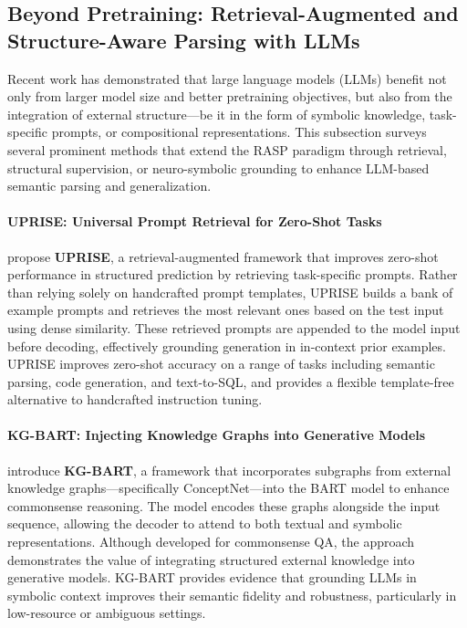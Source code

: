 \subsection{Beyond Pretraining: Retrieval-Augmented and Structure-Aware Parsing with LLMs}

Recent work has demonstrated that large language models (LLMs) benefit not only from larger model size and better pretraining objectives, but also from the integration of external structure—be it in the form of symbolic knowledge, task-specific prompts, or compositional representations. This subsection surveys several prominent methods that extend the RASP paradigm through retrieval, structural supervision, or neuro-symbolic grounding to enhance LLM-based semantic parsing and generalization.

\paragraph{UPRISE: Universal Prompt Retrieval for Zero-Shot Tasks}

\citet{cheng2023uprise} propose \textbf{UPRISE}, a retrieval-augmented framework that improves zero-shot performance in structured prediction by retrieving task-specific prompts. Rather than relying solely on handcrafted prompt templates, UPRISE builds a bank of example prompts and retrieves the most relevant ones based on the test input using dense similarity. These retrieved prompts are appended to the model input before decoding, effectively grounding generation in in-context prior examples. UPRISE improves zero-shot accuracy on a range of tasks including semantic parsing, code generation, and text-to-SQL, and provides a flexible template-free alternative to handcrafted instruction tuning.

\paragraph{KG-BART: Injecting Knowledge Graphs into Generative Models}

\citet{liu2021kgbart} introduce \textbf{KG-BART}, a framework that incorporates subgraphs from external knowledge graphs—specifically ConceptNet—into the BART model to enhance commonsense reasoning. The model encodes these graphs alongside the input sequence, allowing the decoder to attend to both textual and symbolic representations. Although developed for commonsense QA, the approach demonstrates the value of integrating structured external knowledge into generative models. KG-BART provides evidence that grounding LLMs in symbolic context improves their semantic fidelity and robustness, particularly in low-resource or ambiguous settings.

